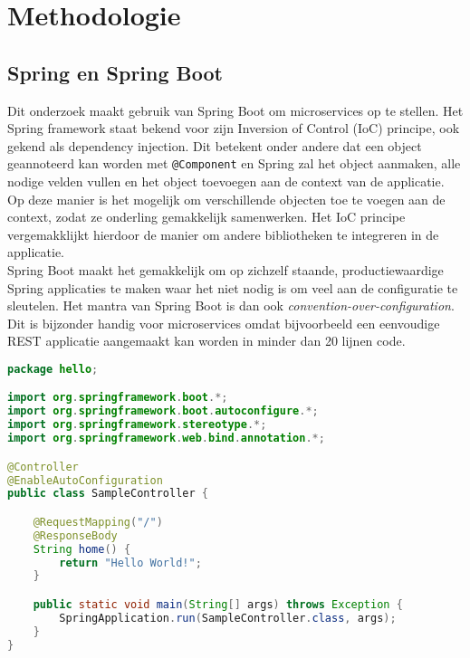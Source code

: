 
\chapter{Methodologie}
\label{ch:methodologie}



\section{Spring en Spring Boot}
\label{ch:spring-boot}

Dit onderzoek maakt gebruik van Spring Boot om microservices op te stellen. Het Spring framework staat bekend voor zijn Inversion of Control (IoC) principe, ook gekend als dependency injection. Dit betekent onder andere dat een object geannoteerd kan worden met \texttt{@Component} en Spring zal het object aanmaken, alle nodige velden vullen en het object toevoegen aan de context van de applicatie. Op deze manier is het mogelijk om verschillende objecten toe te voegen aan de context, zodat ze onderling gemakkelijk samenwerken. Het IoC principe vergemakklijkt hierdoor de manier om andere bibliotheken te integreren in de applicatie. \\

Spring Boot maakt het gemakkelijk om op zichzelf staande, productiewaardige Spring applicaties te maken waar het niet nodig is om veel aan de configuratie te sleutelen. Het mantra van Spring Boot is dan ook \textit{convention-over-configuration}. Dit is bijzonder handig voor microservices omdat bijvoorbeeld een eenvoudige REST applicatie aangemaakt kan worden in minder dan 20 lijnen code. \\

\begin{lstlisting}[language=Java, caption=eenvoudige Spring Boot REST app]
package hello;

import org.springframework.boot.*;
import org.springframework.boot.autoconfigure.*;
import org.springframework.stereotype.*;
import org.springframework.web.bind.annotation.*;

@Controller
@EnableAutoConfiguration
public class SampleController {

    @RequestMapping("/")
    @ResponseBody
    String home() {
        return "Hello World!";
    }

    public static void main(String[] args) throws Exception {
        SpringApplication.run(SampleController.class, args);
    }
}
\end{lstlisting}

